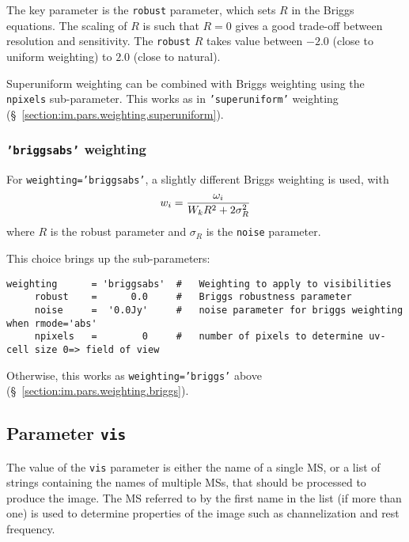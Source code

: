 The key parameter is the {\tt robust} parameter, which sets $R$ in the
Briggs equations.  The scaling of $R$ is such that $R = 0$ gives a
good trade-off between resolution and sensitivity. The {\tt robust}
$R$ takes value between $-2.0$ (close to uniform weighting) 
to $2.0$ (close to natural).

Superuniform weighting can be combined with Briggs weighting
using the {\tt npixels} sub-parameter.  This works as in 
{\tt 'superuniform'} weighting 
(\S~\ref{section:im.pars.weighting.superuniform}).

\subsubsection{{\tt 'briggsabs'} weighting }
\label{section:im.pars.weighting.briggsabs}

For {\tt weighting='briggsabs'}, a slightly different Briggs weighting is used,
with
\begin{equation}
  w_i={\omega_i\over{W_k R^2 + 2 \sigma_R^2}}
\end{equation}
where $R$ is the robust parameter and $\sigma_R$ is the {\tt noise}
parameter. 

This choice brings up the sub-parameters:
\small
\begin{verbatim}
weighting      = 'briggsabs'  #   Weighting to apply to visibilities 
     robust    =      0.0     #   Briggs robustness parameter
     noise     =  '0.0Jy'     #   noise parameter for briggs weighting when rmode='abs'
     npixels   =        0     #   number of pixels to determine uv-cell size 0=> field of view
\end{verbatim}
\normalsize

Otherwise, this works as {\tt weighting='briggs'} above 
(\S~\ref{section:im.pars.weighting.briggs}).

\subsection{Parameter {\tt vis} }
\label{section:im.pars.vis}


The value of the {\tt vis} parameter is either the name of a single
MS, or a list of strings containing the names of multiple MSs, that
should be processed to produce the image.  The MS referred to by the
first name in the list (if more than one) is used to determine
properties of the image such as channelization and rest frequency.

